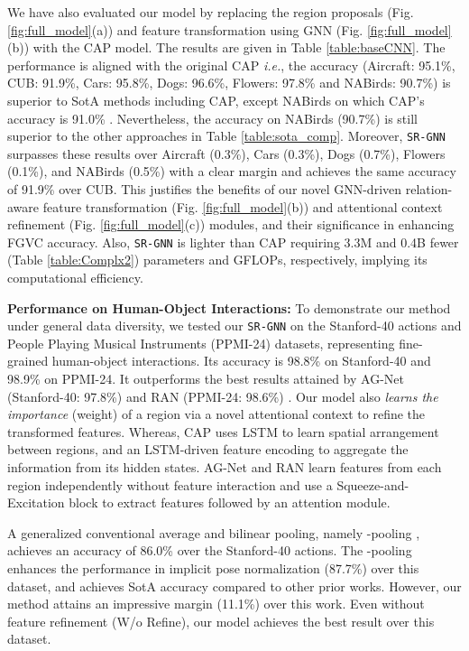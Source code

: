\documentclass[journal]{IEEEtran}
\begin{document}
We have also evaluated our model by replacing the region proposals (Fig. \ref{fig:full_model}(a)) and feature transformation using GNN (Fig. \ref{fig:full_model}(b)) with the CAP \cite{behera2021context} model. The results are given in Table \ref{table:baseCNN}. The performance is aligned with the original CAP \textit{i.e.}, the accuracy (Aircraft: 95.1\%, CUB: 91.9\%, Cars: 95.8\%, Dogs: 96.6\%, Flowers: 97.8\% and NABirds: 90.7\%) is superior to SotA methods including CAP, except NABirds on which CAP’s accuracy is 91.0\% \cite{behera2021context}. Nevertheless, the accuracy on NABirds (90.7\%) is still superior to the other approaches in Table \ref{table:sota_comp}. Moreover, \texttt{SR-GNN} surpasses these results over Aircraft (0.3\%), Cars (0.3\%), Dogs (0.7\%), Flowers (0.1\%), and NABirds (0.5\%) with a clear margin and achieves the same accuracy of 91.9\% over CUB. This justifies the benefits of our novel GNN-driven relation-aware feature transformation (Fig. \ref{fig:full_model}(b)) and attentional context refinement (Fig. \ref{fig:full_model}(c)) modules, and their significance in enhancing FGVC accuracy. Also, \texttt{SR-GNN} is lighter than CAP requiring 3.3M and 0.4B fewer (Table \ref{table:Complx2}) parameters and GFLOPs, respectively, implying its computational efficiency. 

\noindent\textbf{Performance on Human-Object Interactions:} To demonstrate our method under general data diversity, we tested our \texttt{SR-GNN} on the Stanford-40 actions \cite{yao2011human} and People Playing Musical Instruments (PPMI-24) \cite{yao2010grouplet} datasets, representing fine-grained human-object interactions. Its accuracy is 98.8\% on Stanford-40 and 98.9\% on PPMI-24. It outperforms the best results attained by AG-Net (Stanford-40: 97.8\%) \cite{bera2021attend} and RAN (PPMI-24: 98.6\%) \cite{behera2020regional}. Our model also \textit{learns the importance} (weight) of a region via a novel attentional context to refine the transformed features. Whereas, CAP uses LSTM to learn spatial arrangement between regions, and an LSTM-driven feature encoding to aggregate the information from its hidden states. AG-Net and RAN learn features from each region independently without feature interaction and use a Squeeze-and-Excitation block to extract features followed by an attention module.

A generalized conventional average and bilinear pooling, namely -pooling \cite{simon2017generalized}, achieves an accuracy of 86.0\%  over the Stanford-40 actions. The -pooling enhances the performance in implicit pose normalization (87.7\%) \cite{simon2018whole} over this dataset, and achieves SotA accuracy compared to other prior works. However, our method attains an impressive margin (11.1\%) over this work. Even without feature refinement (W/o Refine), our model achieves the best result over this dataset. 
\end{document}
